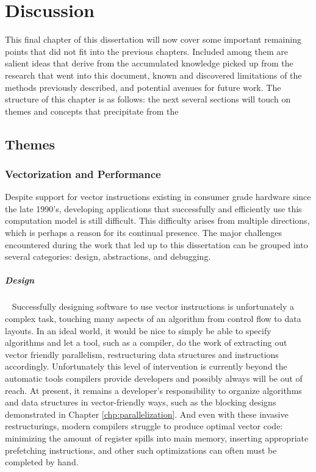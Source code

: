 
\chapter{Discussion}
\label{chp:discussion}

This final chapter of this dissertation will now cover some important
remaining points that did not fit into the previous chapters. Included
among them are salient ideas that derive from the accumulated
knowledge picked up from the research that went into this document,
known and discovered limitations of the methods previously described,
and potential avenues for future work. The structure of this chapter
is as follows: the next several sections will touch on themes and
concepts that precipitate from the



\section{Themes}

\subsection{Vectorization and Performance}

Despite support for vector instructions existing in consumer
grade hardware since the late 1990's, developing applications that
successfully and efficiently use this computation model is still
difficult. This difficulty arises from multiple directions, which is perhaps a
reason for its continual presence. The major challenges encountered
during the work that led up to this dissertation can be grouped into
several categories: design, abstractions, and debugging.

\paragraph{Design}~ Successfully designing software to use vector
instructions is unfortunately a complex task, touching many aspects of
an algorithm from control flow to data layouts. In an ideal world, it
would be nice to simply be able to specify algorithms and let a tool,
such as a compiler, do the work of extracting out vector friendly
parallelism, restructuring data structures and instructions
accordingly. Unfortunately this level of intervention is currently
beyond the automatic tools compilers provide developers and possibly
always will be out of reach. At present, it remains a developer's
responsibility to organize algorithms and data structures in
vector-friendly ways, such as the blocking designs demonstrated in
Chapter \ref{chp:parallelization}. And even with these invasive
restructurings, modern compilers struggle to produce optimal vector
code: minimizing the amount of register spills into main memory,
inserting appropriate prefetching instructions, and other such
optimizations can often must be completed by hand.

